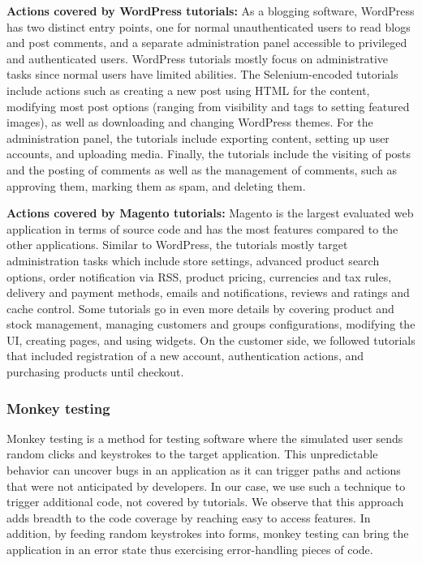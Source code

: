 \vspace{0.5ex}

\noindent \textbf{Actions covered by WordPress tutorials:} As a blogging software, WordPress has two distinct entry points, one for normal unauthenticated users to read blogs and post comments, and a separate administration panel accessible to privileged and authenticated users.
WordPress tutorials mostly focus on administrative tasks since normal users have limited abilities. The Selenium-encoded tutorials include actions such as creating a new post using HTML for the content, modifying most post options (ranging from visibility and tags to setting featured images), as well as downloading and changing WordPress themes.
For the administration panel, the tutorials include exporting content, setting up user accounts, and uploading media. Finally, the tutorials include the visiting of posts and the posting of comments as well as the management of comments, such as approving them, marking them as spam, and deleting them.
\vspace{0.5ex}

\noindent \textbf{Actions covered by Magento tutorials:} Magento is the largest evaluated web application in terms of source code and has the most features compared to the other applications. Similar to WordPress, the tutorials mostly target administration tasks which include store settings, advanced product search options, order notification via RSS, product pricing, currencies and tax rules, delivery and payment methods, emails and notifications, reviews and ratings and cache control. Some tutorials go in even more details by covering product and stock management, managing customers and groups configurations, modifying the UI, creating pages, and using widgets.
On the customer side, we followed tutorials that included registration of a new account, authentication actions, and purchasing products until checkout.






\subsubsection{Monkey testing}
\label{sec:monkey}
Monkey testing is a method for testing
software where the simulated user sends random clicks and keystrokes to the
target application. This unpredictable behavior can uncover bugs in an
application as it can trigger paths and actions that were not anticipated by
developers. In our case, we use such a technique to trigger additional code,
not covered by tutorials. We observe that this approach adds breadth to the
code coverage by reaching easy to access features. In addition, by feeding
random keystrokes into forms, monkey testing can bring the application in an
error state thus exercising error-handling pieces of code.

